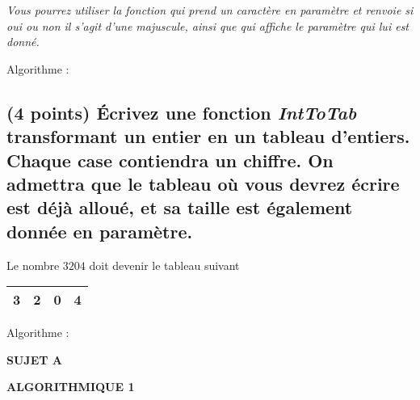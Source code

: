 \documentclass[11pt,a4paper]{article}
\newcommand{\TitreMatiere}{Algorithmique 1}
\begin{document}

\noindent \textit{Vous pourrez utiliser la fonction  qui prend un caractère en paramètre et renvoie si oui ou non il s'agit d'une majuscule, ainsi que  qui affiche le paramètre qui lui est donné.}

\begin{center}
Algorithme :

\bigskip

\end{center}


\clearpage


\subsection{(4 points) \'Ecrivez une fonction \og \textit{IntToTab} \fg{} transformant un entier en un tableau d'entiers. Chaque case contiendra un chiffre. On admettra que le tableau où vous devrez écrire est déjà alloué, et sa taille est également donnée en paramètre. }


\begin{center}
  Le nombre $ 3204 $ doit devenir le tableau suivant

  \smallskip

  \begin{tabular}{| c | c | c | c |}
    \hline
    3 & 2 & 0 & 4 \\
    \hline
  \end{tabular}
\end{center}


\begin{center}
Algorithme :

\bigskip

\end{center}


\clearpage




\vfillFirst

\begin{center}

\begin{LARGE}
\textbf{SUJET A}

\bigskip

\textbf{\MakeUppercase{\TitreMatiere}}
\end{LARGE}

\end{center}

\vfillLast
\end{document}
